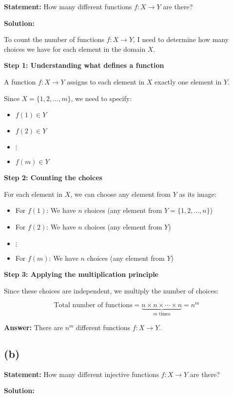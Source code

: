 \documentclass[12pt,a4paper]{article}
\theoremstyle{definition}
\theoremstyle{remark}
\begin{document}
\textbf{Statement:} How many different functions $f : X \to Y$ are there?

\textbf{Solution:}

To count the number of functions $f : X \to Y$, I need to determine how many choices we have for each element in the domain $X$.

\textbf{Step 1: Understanding what defines a function}

A function $f : X \to Y$ assigns to each element in $X$ exactly one element in $Y$.

Since $X = \{1, 2, \ldots, m\}$, we need to specify:
\begin{itemize}
\item $f(1) \in Y$
\item $f(2) \in Y$
\item $\vdots$
\item $f(m) \in Y$
\end{itemize}

\textbf{Step 2: Counting the choices}

For each element in $X$, we can choose any element from $Y$ as its image:

\begin{itemize}
\item For $f(1)$: We have $n$ choices (any element from $Y = \{1, 2, \ldots, n\}$)
\item For $f(2)$: We have $n$ choices (any element from $Y$)
\item $\vdots$
\item For $f(m)$: We have $n$ choices (any element from $Y$)
\end{itemize}

\textbf{Step 3: Applying the multiplication principle}

Since these choices are independent, we multiply the number of choices:

$$\text{Total number of functions} = \underbrace{n \times n \times \cdots \times n}_{m \text{ times}} = n^m$$

\textbf{Answer:} There are $n^m$ different functions $f : X \to Y$.

\subsection*{(b)}

\textbf{Statement:} How many different injective functions $f : X \to Y$ are there?

\textbf{Solution:}
\end{document}
